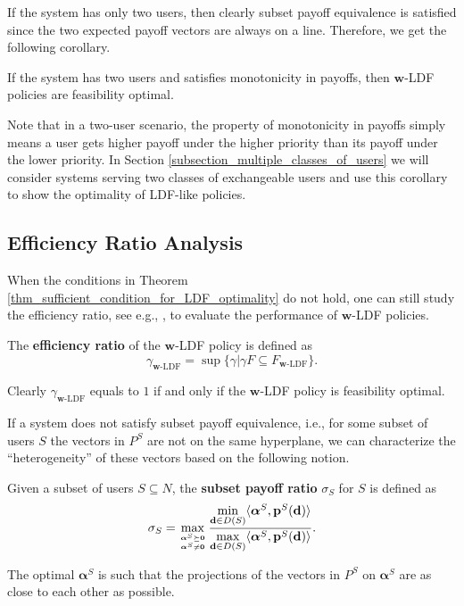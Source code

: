 \documentclass[prodmode,acmtompecs]{acmsmall}
\newcommand{\feasibilityRegion}{F}
\newcommand{\fullUserSet}{N}
\begin{document}
If the system has only two users, then clearly subset payoff equivalence is satisfied since the two expected payoff vectors are always on a line. Therefore, we get the following corollary. 
\begin{corollary}
\label{corollary_two_user_optimality}
If the system has two users and satisfies monotonicity in payoffs, then $\mathbf{w}$-LDF policies are feasibility optimal. 
\end{corollary}

Note that in a two-user scenario, the property of monotonicity in payoffs simply means a user gets higher payoff under the higher priority than its payoff under the lower priority. 
In Section \ref{subsection_multiple_classes_of_users} we will consider systems serving two classes of exchangeable users and use this corollary to show the optimality of LDF-like policies. 

\subsection{Efficiency Ratio Analysis}

When the conditions in Theorem \ref{thm_sufficient_condition_for_LDF_optimality} do not hold, one can still study the efficiency ratio, see e.g., \cite{JLS07}, to evaluate the performance of $\mathbf{w}$-LDF policies. 
\begin{definition}
The {\bf efficiency ratio} of the $\mathbf{w}$-LDF policy is defined as
$$
\gamma_{\mathbf{w}\text{-LDF}} = \sup\{\gamma|\gamma \feasibilityRegion \subseteq \feasibilityRegion_{\mathbf{w}\text{-LDF}} \}. 
$$
\end{definition}
Clearly $\gamma_{\mathbf{w}\text{-LDF}}$ equals to $1$ if and only if the $\mathbf{w}$-LDF policy is feasibility optimal. 




If a system does not satisfy subset payoff equivalence, i.e., for some subset of users $S$ the vectors in $P^S$ are not on the same hyperplane, we can characterize the ``heterogeneity'' of these vectors based on the following notion. 

\begin{definition}
Given a subset of users $S \subseteq \fullUserSet$, the {\bf subset payoff ratio} $\sigma_S$ for $S$ is defined as
\begin{align}
\label{align_subset_payoff_ratio}
\sigma_S = \max\limits_{{\boldsymbol{\alpha}^S \succeq \mathbf{0}} \atop {\boldsymbol{\alpha}^S \neq \mathbf{0}}} \frac
{\min\limits_{\mathbf{d} \in D(S)} \langle \boldsymbol{\alpha}^S, \mathbf{p}^S(\mathbf{d}) \rangle}
{\max\limits_{\mathbf{d} \in D(S)} \langle \boldsymbol{\alpha}^S, \mathbf{p}^S(\mathbf{d}) \rangle}. 
\end{align}
\end{definition}
The optimal $\boldsymbol{\alpha}^S$ is such that the projections of the vectors in $P^S$ on $\boldsymbol{\alpha}^S$ are as close to each other as possible. 
\end{document}
